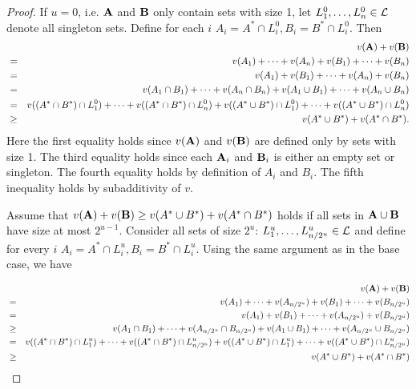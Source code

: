 \begin{proof}
\smallskip
{} If $u=0$, i.e. $\mathbf{A}$ and $\mathbf{B}$ only contain sets with size 1, let $L^{0}_1, \dots, L^{0}_{n} \in \mathcal{L}$ denote all singleton sets. Define for each $i$ $A_i = A^* \cap L^{0}_i, B_i = B^* \cap L^{0}_i$. Then
\begin{eqnarray*}
	& &v(\mathbf{A}) + v(\mathbf{B}) \\
	&=& v(A_1) + \dots + v(A_n) +  v(B_1) + \dots + v(B_n) \\
	& = & v(A_1) + v(B_1) + \dots + v(A_n) + v(B_n) \\
	& = & v(A_1 \cap B_1) + \dots + v(A_n \cap B_n) + v(A_1 \cup B_1) + \dots + v(A_n \cup B_n) \\
	& = & v((A^* \cap B^*) \cap L^{0}_1) + \dots + v( (A^* \cap B^*) \cap L^{0}_n) +  v( (A^* \cup B^*) \cap L^{0}_1) + \dots + v( (A^* \cup B^*) \cap L^{0}_n) \\
	& \geq & v(A^{*} \cup B^{*}) + v(A^{*} \cap B^{*}).
\end{eqnarray*}
Here the first equality holds since $v(\mathbf{A})$ and $v(\mathbf{B})$ are defined only by sets with size 1.
The third equality holds since each $\mathbf{A}_i$ and $\mathbf{B}_i$ is either an empty set or singleton. The fourth equality holds by definition of $A_i$ and $B_i$. The fifth inequality holds by subadditivity of $v$.

\smallskip
{} Assume that $v(\mathbf{A}) + v(\mathbf{B}) \geq v(A^{*} \cup B^{*}) + v(A^{*} \cap B^{*})$ holds if all sets in $\mathbf{A}\cup \mathbf{B}$ have size at most $2^{u-1}$. Consider all sets of size $2^u$: $L^{u}_1, \dots, L^{u}_{n/2^u} \in \mathcal{L}$ and define for every $i$ $A_i = A^* \cap L^{u}_i, B_i = B^* \cap L^{u}_i$. Using the same argument as in the base case, we have 

\begin{eqnarray*}
& &v(\mathbf{A}) + v(\mathbf{B})\\
& = &v(A_1) + \dots + v(A_{n/2^{u}}) +  v(B_1) + \dots + v(B_{n/2^{u}})\\
& =  & v(A_1) + v(B_1) + \dots + v(A_{n/2^{u}}) + v(B_{n/2^{u}}) \\
& \geq & v(A_1 \cap B_1) + \dots + v(A_{n/2^{u}} \cap B_{n/2^{u}}) + v(A_1 \cup B_1) + \dots + v(A_{n/2^{u}} \cup B_{n/2^{u}}) \\
& = & v( (A^* \cap B^*) \cap L^{u}_1) + \dots + v( (A^* \cap B^*) \cap L^{u}_{n/2^{u}}) +  v( (A^* \cup B^*) \cap L^{u}_1) + \dots + v( (A^* \cup B^*) \cap L^{u}_{n/2^{u}}) \\
&\geq &v(A^{*} \cup B^{*}) + v(A^{*} \cap B^{*})
\end{eqnarray*}


\end{proof}
